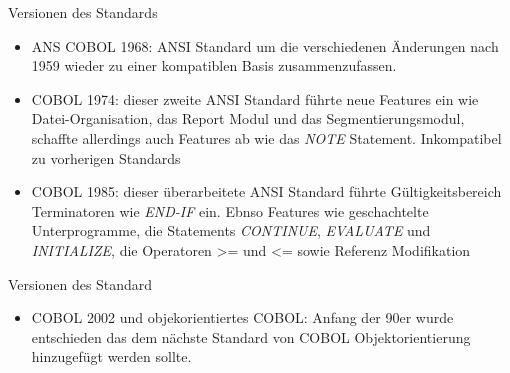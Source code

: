 \documentclass{beamer}
\begin{document}
\begin{frame}{Versionen des Standards}
  \begin{itemize}
  \item
    ANS COBOL 1968: ANSI Standard um die verschiedenen Änderungen nach 1959 wieder zu einer kompatiblen Basis zusammenzufassen.
  \item
    COBOL 1974: dieser zweite ANSI Standard führte neue Features ein wie Datei-Organisation, das Report Modul und das Segmentierungsmodul, schaffte allerdings auch Features ab wie das \emph{NOTE} Statement. Inkompatibel zu vorherigen Standards
  \item
    COBOL 1985: dieser überarbeitete ANSI Standard führte Gültigkeitsbereich Terminatoren wie \emph{END-IF} ein. Ebnso Features wie geschachtelte Unterprogramme, die Statements \emph{CONTINUE}, \emph{EVALUATE} und \emph{INITIALIZE}, die Operatoren >= und <= sowie Referenz Modifikation
  \end{itemize}
\end{frame}

\begin{frame}{Versionen des Standard}
  \begin{itemize}
    \item
      COBOL 2002 und objekorientiertes COBOL: Anfang der 90er wurde entschieden das dem nächste Standard von COBOL Objektorientierung hinzugefügt werden sollte.
  \end{itemize}
\end{frame}
\end{document}
